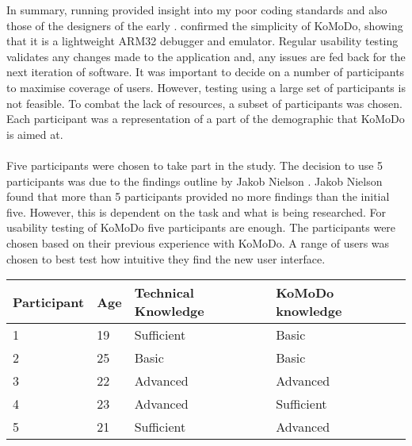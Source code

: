 In summary, running  provided insight into my poor coding standards and also those of the designers of the early .  confirmed the simplicity of KoMoDo, showing that it is a lightweight ARM32 debugger and emulator.
%
%
%
%
%
Regular usability testing validates any changes made to the application and, any issues are fed back for the next iteration of software. It was important to decide on a number of participants to maximise coverage of users. However, testing using a large set of participants is not feasible. To combat the lack of resources, a subset of participants was chosen. Each participant was a representation of a part of the demographic that KoMoDo is aimed at.\\\\
%
Five participants were chosen to take part in the study. The decision to use 5 participants was due to the findings outline by Jakob Nielson \cite{usability_engineer}. Jakob Nielson found that more than 5 participants provided no more findings than the initial five. However, this is dependent on the task and what is being researched. For usability testing of KoMoDo five participants are enough.
%
The participants were chosen based on their previous experience with KoMoDo. A range of users was chosen to best test how intuitive they find the new user interface.
\begin{center}
\begin{tabular}{| l |  p{1cm} | p{4cm} | p{4cm} | }
		\hline
		Participant & Age & Technical Knowledge & KoMoDo knowledge \\ \hline
		1 & 19 & Sufficient & Basic \\ \hline
		2 & 25 & Basic & Basic \\ \hline
		3 & 22 & Advanced & Advanced \\ \hline
		4 & 23 & Advanced & Sufficient \\ \hline
		5 & 21 & Sufficient & Advanced \\ \hline
\end{tabular}
\end{center}

